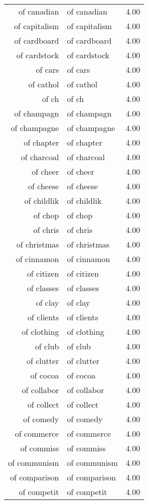\begin{table}[ht]
\begin{tabular}{rlr}
  of canadian & of canadian & 4.00 \\ 
  of capitalism & of capitalism & 4.00 \\ 
  of cardboard & of cardboard & 4.00 \\ 
  of cardstock & of cardstock & 4.00 \\ 
  of cars & of cars & 4.00 \\ 
  of cathol & of cathol & 4.00 \\ 
  of ch & of ch & 4.00 \\ 
  of champagn & of champagn & 4.00 \\ 
  of champagne & of champagne & 4.00 \\ 
  of chapter & of chapter & 4.00 \\ 
  of charcoal & of charcoal & 4.00 \\ 
  of cheer & of cheer & 4.00 \\ 
  of cheese & of cheese & 4.00 \\ 
  of childlik & of childlik & 4.00 \\ 
  of chop & of chop & 4.00 \\ 
  of chris & of chris & 4.00 \\ 
  of christmas & of christmas & 4.00 \\ 
  of cinnamon & of cinnamon & 4.00 \\ 
  of citizen & of citizen & 4.00 \\ 
  of classes & of classes & 4.00 \\ 
  of clay & of clay & 4.00 \\ 
  of clients & of clients & 4.00 \\ 
  of clothing & of clothing & 4.00 \\ 
  of club & of club & 4.00 \\ 
  of clutter & of clutter & 4.00 \\ 
  of cocoa & of cocoa & 4.00 \\ 
  of collabor & of collabor & 4.00 \\ 
  of collect & of collect & 4.00 \\ 
  of comedy & of comedy & 4.00 \\ 
  of commerce & of commerce & 4.00 \\ 
  of commiss & of commiss & 4.00 \\ 
  of communism & of communism & 4.00 \\ 
  of comparison & of comparison & 4.00 \\ 
  of competit & of competit & 4.00 \\ 

\end{tabular}
\end{table}
